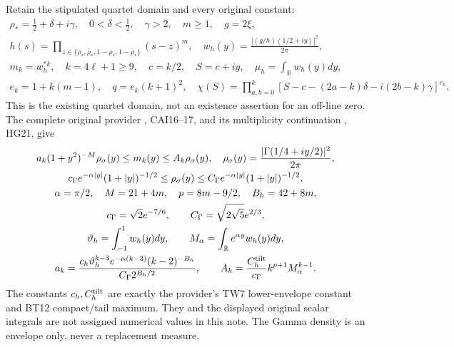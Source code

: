 \documentclass[11pt]{article}
\newcommand{\R}{\mathbb R}
\begin{document}
Retain the stipulated quartet domain and every original constant:
\begin{equation}\label{eq:objects}
\begin{gathered}
 \rho_*=\tfrac12+\delta+i\gamma,\quad 0<\delta<\tfrac12,
 \quad\gamma>2,\quad m\ge1,\quad g=2\xi,\\
 h(s)=\prod_{z\in\{\rho_*,\bar\rho_*,1-\rho_*,1-\bar\rho_*\}}(s-z)^m,
 \quad w_h(y)=\frac{|(g/h)(1/2+iy)|^2}{2\pi},\\
 m_k=w_h^{*k},\quad k=4\ell+1\ge9,\quad
 c=k/2,\quad S=c+iy,\quad \mu_h=\int_\R w_h(y)dy,\\
 e_k=1+k(m-1),\quad q=e_k(k+1)^2,\quad
 \chi(S)=\prod_{a,b=0}^k
 [S-c-(2a-k)\delta-i(2b-k)\gamma]^{e_k}.
\end{gathered}
\end{equation}
This is the existing quartet domain, not an existence assertion for
an off-line zero. The complete original provider \cite{CAI},
CAI16--17, and its multiplicity continuation \cite{HG}, HG21, give
\begin{equation}\label{eq:envelope}
\begin{gathered}
 a_k(1+y^2)^{-M}\rho_\sigma(y)\le m_k(y)\le A_k\rho_\sigma(y),
 \quad \rho_\sigma(y)=\frac{|\Gamma(1/4+iy/2)|^2}{2\pi},\\
 c_\Gamma e^{-\alpha|y|}(1+|y|)^{-1/2}
 \le\rho_\sigma(y)\le
 C_\Gamma e^{-\alpha|y|}(1+|y|)^{-1/2},\\
 \alpha=\pi/2,\quad M=21+4m,\quad p=8m-9/2,\quad B_h=42+8m,\\
 c_\Gamma=\sqrt2e^{-7/6},\qquad C_\Gamma=\sqrt{2\sqrt5}e^{2/3},\\
 \vartheta_h=\int_{-1}^1w_h(y)dy,\qquad
 M_\alpha=\int_\R e^{\alpha y}w_h(y)dy,\\
 a_k=\frac{c_h\vartheta_h^{k-3}e^{-\alpha(k-3)}(k-2)^{-B_h}}
 {C_\Gamma2^{B_h/2}},\qquad
 A_k=\frac{C_h^{\rm tilt}}{c_\Gamma}k^{p+1}M_\alpha^{k-1}.
\end{gathered}
\end{equation}
The constants $c_h,C_h^{\rm tilt}$ are exactly the provider's TW7
lower-envelope constant and BT12 compact/tail maximum. They and the
displayed original scalar integrals are not assigned numerical values
in this note. The Gamma density is an envelope only, never a
replacement measure.
\end{document}
